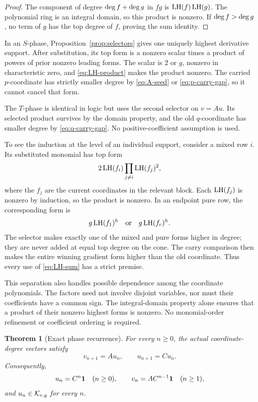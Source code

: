 \documentclass[11pt]{article}
\newtheorem{theorem}{Theorem}[section]
\theoremstyle{remark}
\numberwithin{equation}{section}
\begin{document}
\begin{proof}
The component of degree \(\operatorname{deg} f+\operatorname{deg} g\) in \(fg\) is
\(\operatorname{LH}(f)\operatorname{LH}(g)\).  The polynomial ring is an integral domain, so this
product is nonzero.  If \(\operatorname{deg} f>\operatorname{deg} g\), no term of \(g\) has the top
degree of \(f\), proving the sum identity.
\end{proof}

In an \(S\)-phase, Proposition~\ref{prop:selectors} gives one uniquely
highest derivative support.  After substitution, its top form is a nonzero
scalar times a product of powers of prior nonzero leading forms.  The scalar
is \(2\) or \(g\), nonzero in characteristic zero, and
\eqref{eq:LH-product} makes the product nonzero.  The carried
\(p\)-coordinate has strictly smaller degree by \eqref{eq:A-seed} or
\eqref{eq:p-carry-gap}, so it cannot cancel that form.

The \(T\)-phase is identical in logic but uses the second selector on
\(v=Au\).  Its selected product survives by the domain property, and the
old \(q\)-coordinate has smaller degree by \eqref{eq:q-carry-gap}.  No
positive-coefficient assumption is used.

To see the induction at the level of an individual support, consider a mixed
row \(i\).  Its substituted monomial has top form
\[
2\operatorname{LH}(f_i)\prod_{j\neq i}\operatorname{LH}(f_j)^2,
\]
where the \(f_j\) are the current coordinates in the relevant block.  Each
\(\operatorname{LH}(f_j)\) is nonzero by induction, so the product is nonzero.  In an
endpoint pure row, the corresponding form is
\[
g\operatorname{LH}(f_1)^h
\quad\text{or}\quad
g\operatorname{LH}(f_r)^h.
\]
The selector makes exactly one of the mixed and pure forms higher in degree;
they are never added at equal top degree on the cone.  The carry comparison
then makes the entire winning gradient form higher than the old coordinate.
Thus every use of \eqref{eq:LH-sum} has a strict premise.

This separation also handles possible dependence among the coordinate
polynomials.  The factors need not involve disjoint variables, nor must
their coefficients have a common sign.  The integral-domain property alone
ensures that a product of their nonzero highest forms is nonzero.  No
monomial-order refinement or coefficient ordering is required.

\begin{theorem}[Exact phase recurrence]\label{thm:phase-recurrence}
For every \(n\geq0\), the actual coordinate-degree vectors satisfy
\begin{equation}\label{eq:phase-recurrence}
v_{n+1}=Au_n,\qquad u_{n+1}=Cu_n.
\end{equation}
Consequently,
\begin{equation}\label{eq:un-vn}
u_n=C^n\mathbf{1}\quad(n\geq0),\qquad
v_n=AC^{n-1}\mathbf{1}\quad(n\geq1),
\end{equation}
and \(u_n\in\mathcal{K}_{r,g}\) for every \(n\).
\end{theorem}
\end{document}

